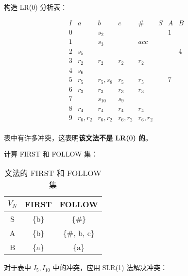\begin{enumerate}
    构造 LR(0) 分析表：
    
    \begin{table}[H]
        \centering
        \begin{equation*}
            \begin{array}{c|cccc|ccc}
                I & a & b & c & \# & S & A & B \\
                \hline
                0 & & s_2 & & & & 1 & \\
                1 & & s_3 & & acc & & & \\
                2 & s_5 & & & & & & 4 \\
                3 & r_2 & r_2 & r_2 & r_2 & & & \\
                4 & s_6 & & & & & & \\
                5 & r_5 & r_5, s_8 & r_5 & r_5 & & 7 & \\
                6 & r_3 & r_3 & r_3 & r_3 & & & \\
                7 & & s_{10} & s_9 & & & & \\
                8 & r_4 & r_4 & r_4 & r_4 & & & \\
                9 & r_6, r_2 & r_6, r_2 & r_6, r_2 & r_6, r_2 & & & \\
            \end{array}
        \end{equation*}
        \label{tab:SLR_7_1}
    \end{table}
    
    表中有许多冲突，这表明\textbf{该文法不是 LR(0) 的}。
    
    计算 FIRST 和 FOLLOW 集：
    
    \begin{table}[H]
        \centering
        \begin{tabular}{c|cc}
            $V_N$ & FIRST & FOLLOW \\
            \hline
            S & \{b\} & \{\#\} \\
            A & \{b\} & \{\#, b, c\} \\
            B & \{a\} & \{a\} \\
        \end{tabular}
        \caption{文法的 FIRST 和 FOLLOW 集}
        \label{tab:FF_7}
    \end{table}
    
    对于表中 $I_5, I_{10}$ 中的冲突，应用 SLR(1) 法解决冲突：
    

\end{enumerate}
